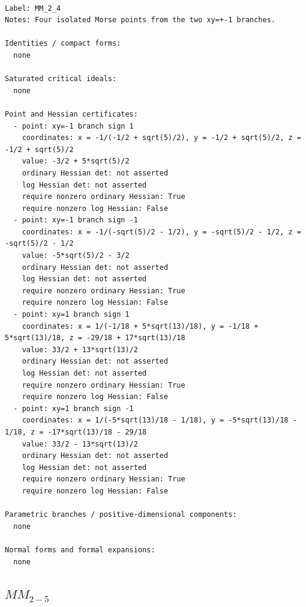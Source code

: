 \documentclass[10pt,a4paper]{article}
\begin{document}
\begin{lstlisting}

Label: MM_2_4
Notes: Four isolated Morse points from the two xy=+-1 branches.

Identities / compact forms:
  none

Saturated critical ideals:
  none

Point and Hessian certificates:
  - point: xy=-1 branch sign 1
    coordinates: x = -1/(-1/2 + sqrt(5)/2), y = -1/2 + sqrt(5)/2, z = -1/2 + sqrt(5)/2
    value: -3/2 + 5*sqrt(5)/2
    ordinary Hessian det: not asserted
    log Hessian det: not asserted
    require nonzero ordinary Hessian: True
    require nonzero log Hessian: False
  - point: xy=-1 branch sign -1
    coordinates: x = -1/(-sqrt(5)/2 - 1/2), y = -sqrt(5)/2 - 1/2, z = -sqrt(5)/2 - 1/2
    value: -5*sqrt(5)/2 - 3/2
    ordinary Hessian det: not asserted
    log Hessian det: not asserted
    require nonzero ordinary Hessian: True
    require nonzero log Hessian: False
  - point: xy=1 branch sign 1
    coordinates: x = 1/(-1/18 + 5*sqrt(13)/18), y = -1/18 + 5*sqrt(13)/18, z = -29/18 + 17*sqrt(13)/18
    value: 33/2 + 13*sqrt(13)/2
    ordinary Hessian det: not asserted
    log Hessian det: not asserted
    require nonzero ordinary Hessian: True
    require nonzero log Hessian: False
  - point: xy=1 branch sign -1
    coordinates: x = 1/(-5*sqrt(13)/18 - 1/18), y = -5*sqrt(13)/18 - 1/18, z = -17*sqrt(13)/18 - 29/18
    value: 33/2 - 13*sqrt(13)/2
    ordinary Hessian det: not asserted
    log Hessian det: not asserted
    require nonzero ordinary Hessian: True
    require nonzero log Hessian: False

Parametric branches / positive-dimensional components:
  none

Normal forms and formal expansions:
  none

\end{lstlisting}

\subsection*{$ MM_{2-5} $}
\end{document}
